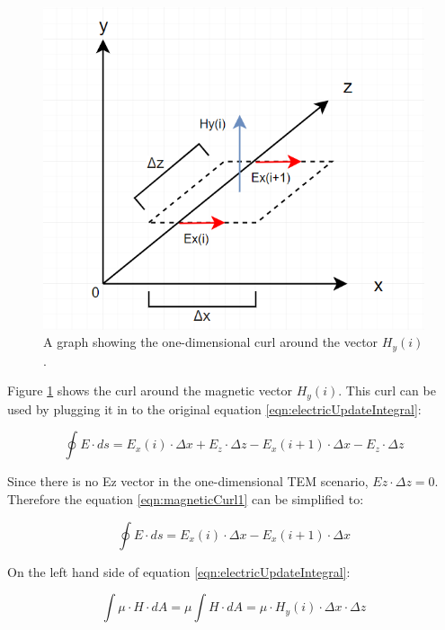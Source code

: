 \begin{figure}
	\centering
	\includegraphics[scale=0.7]{Figures/fdtd1dHcurl}
	\decoRule
	\caption[1D Curl around $H_y$]{A graph showing the one-dimensional curl around the vector $H_y(i)$.}
	\label{fig:fdtd1dHcurl}
\end{figure}

Figure \ref{fig:fdtd1dHcurl} shows the curl around the magnetic vector $H_y(i)$. This curl can be used by plugging it in to the original equation \ref{eqn:electricUpdateIntegral}:

\begin{equation}
	\label{eqn:magneticCurl1}
	\oint E \cdot ds = E_x(i) \cdot \Delta x + E_z \cdot \Delta z - E_x(i+1) \cdot \Delta x - E_z \cdot \Delta z
\end{equation}

Since there is no Ez vector in the one-dimensional TEM scenario, $Ez \cdot \Delta z = 0$. Therefore the equation \ref{eqn:magneticCurl1} can be simplified to:

\begin{equation}
	\label{eqn:magneticCurl2}
	\oint E \cdot ds = E_x(i) \cdot \Delta x - E_x(i+1) \cdot \Delta x
\end{equation}

On the left hand side of equation \ref{eqn:electricUpdateIntegral}:

\begin{equation}
	\label{eqn:magneticCurl3}
	\int \mu \cdot H \cdot dA = \mu \int H \cdot dA = \mu \cdot H_y(i) \cdot \Delta x \cdot \Delta z
\end{equation}

